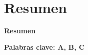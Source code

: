 \documentclass[../main.tex]{subfiles}
\begin{document}
\makeatletter
\renewenvironment{abstract}{%
    \if@twocolumn
      \section*{Resumen \\}%
    \else %
    \begin{flushright}
        {\filleft\Huge\bfseries\fontsize{48pt}{12}\selectfont Resumen\vspace{\z@}}%
        \end{flushright}
      \quotation
    \fi}
    {\if@twocolumn\else\endquotation\fi}
\makeatother
\makeatletter
\renewenvironment{abstract}{%
    \if@twocolumn
      \section*{Resumen \\}%
    \else %
    \begin{flushright}
        {\filleft\Huge\bfseries\fontsize{48pt}{12}\selectfont Resumen\vspace{\z@}}%
        \end{flushright}
      \quotation
    \fi}
    {\if@twocolumn\else\endquotation\fi}
\makeatother
\begin{abstract}
\blindtext

\bfseries{\large{Palabras clave:}} A, B, C

\end{abstract}
\end{document}
